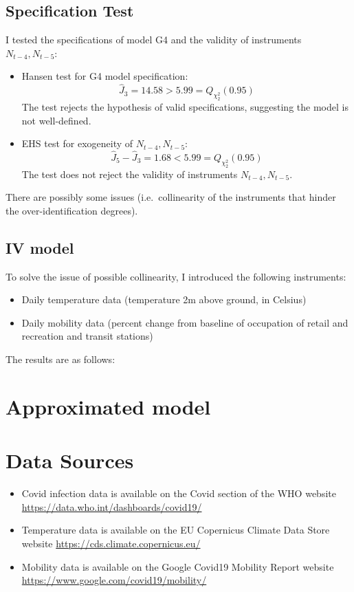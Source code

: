     \subsection{Specification Test}
    I tested the specifications of model G4 and the validity of instruments $N_{t-4}, N_{t-5}$:
    \begin{itemize}
        \item Hansen test for G4 model specification:
            \begin{equation}
                \hat J_3 = 14.58 > 5.99 =Q_{\chi^2_2}(0.95)
            \end{equation}
            The test rejects the hypothesis of valid specifications, suggesting the model is not well-defined.
        \item EHS test for exogeneity of $N_{t-4}, N_{t-5}$:
            \begin{equation}
                \hat J_5 - \hat J_3 = 1.68 < 5.99 =Q_{\chi^2_2}(0.95)
            \end{equation}
            The test does not reject the validity of instruments $N_{t-4}, N_{t-5}$.
    \end{itemize}
    There are possibly some issues (i.e.\ collinearity of the instruments that hinder the over-identification degrees).

    \subsection{IV model}
    To solve the issue of possible collinearity, I introduced the following instruments:
    \begin{itemize}
        \item Daily temperature data (temperature 2m above ground, in Celsius)
        \item Daily mobility data (percent change from baseline of occupation of retail and recreation and transit stations)
    \end{itemize}

    The results are as follows:

    \section{Approximated model}



    \section{Data Sources}
    \begin{itemize}
        \item Covid infection data is available on the Covid section of the WHO website \url{https://data.who.int/dashboards/covid19/}
        \item Temperature data is available on the EU Copernicus Climate Data Store website \url{https://cds.climate.copernicus.eu/}
        \item Mobility data is available on the Google Covid19 Mobility Report website \url{https://www.google.com/covid19/mobility/}
    \end{itemize}




